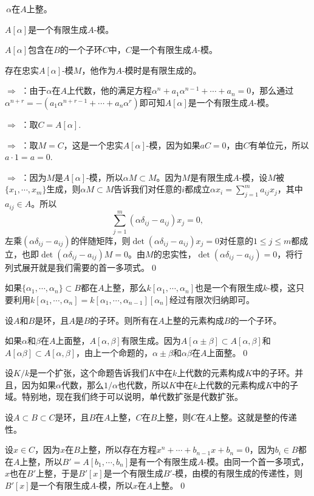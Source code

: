 	 $\,\alpha$在$A$上整。

	 $A[\alpha]$是一个有限生成$A$-模。

	 $A[\alpha]$包含在$B$的一个子环$C$中，$C$是一个有限生成$A$-模。

	 存在忠实$A[\alpha]$-模$M$，他作为$A$-模时是有限生成的。
	\label{p2:1}

\proof {} $\Rightarrow$  ：由于$\alpha$在$A$上代数，他的满足方程$\alpha^n+a_1\alpha^{n-1}+\cdots+a_n=0$，那么通过$\alpha^{n+r}=-(a_1\alpha^{n+r-1}+\cdots+a_n\alpha^r)$即可知$A[\alpha]$是一个有限生成$A$-模。

	 $\Rightarrow$  ：取$C=A[\alpha]$.

	 $\Rightarrow$  ：取$M=C$，这是一个忠实$A[\alpha]$-模，因为如果$aC=0$，由$C$有单位元，所以$a\cdot 1=a=0$.

	 $\Rightarrow$  ：因为$M$是$A[\alpha]$-模，所以$\alpha M\subset M$。因为$M$是有限生成$A$-模，设$M$被$\{x_1,\cdots,x_m\}$生成，则$\alpha M\subset M$告诉我们对任意的$i$都成立$\alpha x_i=\sum_{j=1}^m a_{ij} x_j$，其中$a_{ij}\in A$。所以
	\[
		\sum_{j=1}^m (\alpha\delta_{ij} -a_{ij})x_j=0,
	\]
	左乘$(\alpha\delta_{ij} -a_{ij})$的伴随矩阵，则$\det(\alpha\delta_{ij} -a_{ij})x_j=0$对任意的$1\leq j \leq m$都成立，也即$\det(\alpha\delta_{ij} -a_{ij})M=0$。由$M$的忠实性，$\det(\alpha\delta_{ij} -a_{ij})=0$，将行列式展开就是我们需要的首一多项式。\qed

如果$\{\alpha_1,\cdots,\alpha_n\}\subset B$都在$A$上整，那么$k[\alpha_1,\cdots,\alpha_n]$也是一个有限生成$k$-模，这只要利用$k[\alpha_1,\cdots,\alpha_n]=k[\alpha_1,\cdots,\alpha_{n-1}][\alpha_n]$经过有限次归纳即可。

\pro 设$A$和$B$是环，且$A$是$B$的子环。则所有在$A$上整的元素构成$B$的一个子环。

\proof 如果$\alpha$和$\beta$在$A$上面整，$A[\alpha,\beta]$有限生成。因为$A[\alpha\pm\beta]\subset A[\alpha,\beta]$和$A[\alpha\beta]\subset A[\alpha,\beta]$，由上一个命题的，$\alpha\pm\beta$和$\alpha\beta$在$A$上面整。\qed

设$K/k$是一个扩张，这个命题告诉我们$K$中在$k$上代数的元素构成$K$中的子环。并且，因为如果$\alpha$代数，那么$1/\alpha$也代数，所以$K$中在$k$上代数的元素构成$K$中的子域。特别地，现在我们终于可以说明，单代数扩张是代数扩张。

\pro 设$A\subset B\subset C$是环，且$B$在$A$上整，$C$在$B$上整，则$C$在$A$上整。这就是整的传递性。

\proof 设$x\in C$，因为$x$在$B$上整，所以存在方程$x^n+\cdots+b_{n-1}x+b_n=0$，因为$b_i\in B$都在$A$上整，所以$B'=A[b_1,\cdots,b_n]$是有一个有限生成$A$-模。由同一个首一多项式，$x$也在$B'$上整，于是$B'[x]$是一个有限生成$B'$-模，由模的有限生成的传递性，则$B'[x]$是一个有限生成$A$-模，所以$x$在$A$上整。\qed

